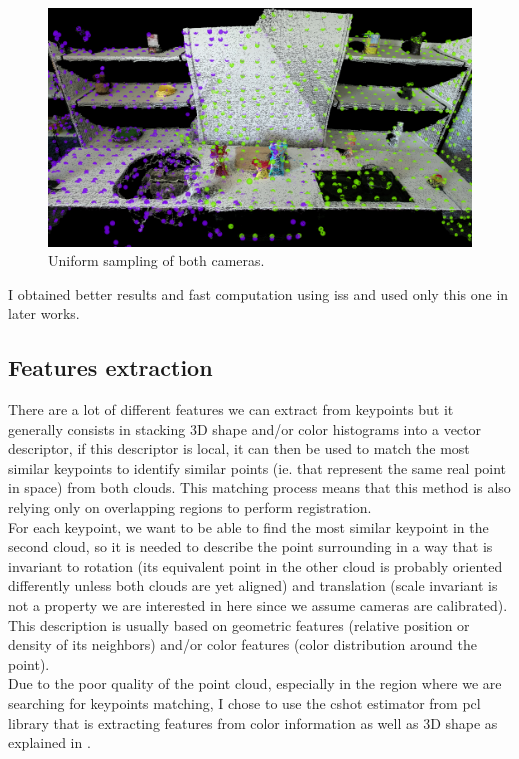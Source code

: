     \begin{figure}[h!]
        \centering
        \includegraphics[width=\textwidth]{images/unif_100.png}
        \caption{Uniform sampling of both cameras.}
        \label{fig:unif_kp}
    \end{figure}    
    
    I obtained better results and fast computation using \acrshort{iss} and used only this one in later works.

\subsection{Features extraction}

    There are a lot of different features we can extract from keypoints but it generally consists in stacking 3D shape and/or color histograms into a vector descriptor, if this descriptor is local, it can then be used to match the most similar keypoints to identify similar points (ie. that represent the same real point in space) from both clouds. This matching process means that this method is also relying only on overlapping regions to perform registration. \\
    For each keypoint, we want to be able to find the most similar keypoint in the second cloud, so it is needed to describe the point surrounding in a way that is invariant to rotation (its equivalent point in the other cloud is probably oriented differently unless both clouds are yet aligned) and translation (scale invariant is not a property we are interested in here since we assume cameras are  calibrated). This description is usually based on geometric features (relative position or density of its neighbors) and/or color features (color distribution around the point). \\
    Due to the poor quality of the point cloud, especially in the region where we are searching for keypoints matching, I chose to use the \acrshort{cshot} estimator from \acrshort{pcl} library that is extracting features from color information as well as 3D shape as explained in \cite{tombari2011}.
    
